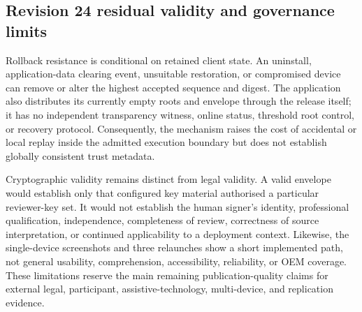 

\subsection{Revision 24 residual validity and governance limits}

Rollback resistance is conditional on retained client state. An uninstall, application-data clearing event, unsuitable restoration, or compromised device can remove or alter the highest accepted sequence and digest. The application also distributes its currently empty roots and envelope through the release itself; it has no independent transparency witness, online status, threshold root control, or recovery protocol. Consequently, the mechanism raises the cost of accidental or local replay inside the admitted execution boundary but does not establish globally consistent trust metadata.

Cryptographic validity remains distinct from legal validity. A valid envelope would establish only that configured key material authorised a particular reviewer-key set. It would not establish the human signer's identity, professional qualification, independence, completeness of review, correctness of source interpretation, or continued applicability to a deployment context. Likewise, the single-device screenshots and three relaunches show a short implemented path, not general usability, comprehension, accessibility, reliability, or OEM coverage. These limitations reserve the main remaining publication-quality claims for external legal, participant, assistive-technology, multi-device, and replication evidence.

